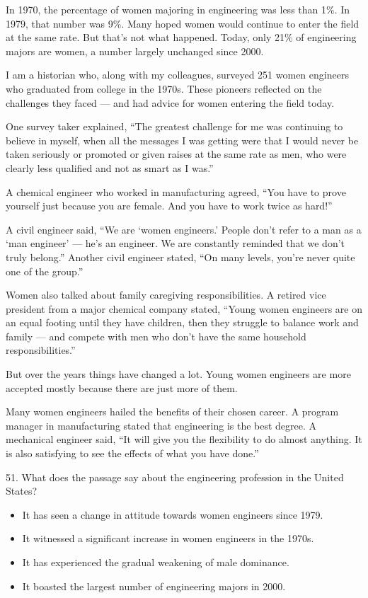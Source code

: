 \documentclass[UTF8,11pt]{ctexart}
\begin{document}
In 1970, the percentage of women majoring in engineering was less than 1\%. In 1979, that number was 9\%. Many hoped women would continue to enter the field at the same rate. But that’s not what happened. Today, only 21\% of engineering majors are women, a number largely unchanged since 2000.


I am a historian who, along with my colleagues, surveyed 251 women engineers who graduated from college in the 1970s. These pioneers reflected on the challenges they faced — and had advice for women entering the field today.


One survey taker explained, “The greatest challenge for me was continuing to believe in myself, when all the messages I was getting were that I would never be taken seriously or promoted or given raises at the same rate as men, who were clearly less qualified and not as smart as I was.”


A chemical engineer who worked in manufacturing agreed, “You have to prove yourself just because you are female. And you have to work twice as hard!”


A civil engineer said, “We are ‘women engineers.’ People don’t refer to a man as a ‘man engineer’ — he’s an engineer. We are constantly reminded that we don’t truly belong.” Another civil engineer stated, “On many levels, you’re never quite one of the group.”


Women also talked about family caregiving responsibilities. A retired vice president from a major chemical company stated, “Young women engineers are on an equal footing until they have children, then they struggle to balance work and family — and compete with men who don’t have the same household responsibilities.”


But over the years things have changed a lot. Young women engineers are more accepted mostly because there are just more of them.


Many women engineers hailed the benefits of their chosen career. A program manager in manufacturing stated that engineering is the best degree. A mechanical engineer said, “It will give you the flexibility to do almost anything. It is also satisfying to see the effects of what you have done.”


51. What does the passage say about the engineering profession in the United States?


\begin{itemize}[leftmargin=2em,itemsep=.2em,topsep=.4em]\item[A.] It has seen a change in attitude towards women engineers since 1979.
\item[B.] It witnessed a significant increase in women engineers in the 1970s.
\item[C.] It has experienced the gradual weakening of male dominance.
\item[D.] It boasted the largest number of engineering majors in 2000.
\end{itemize}
\end{document}
